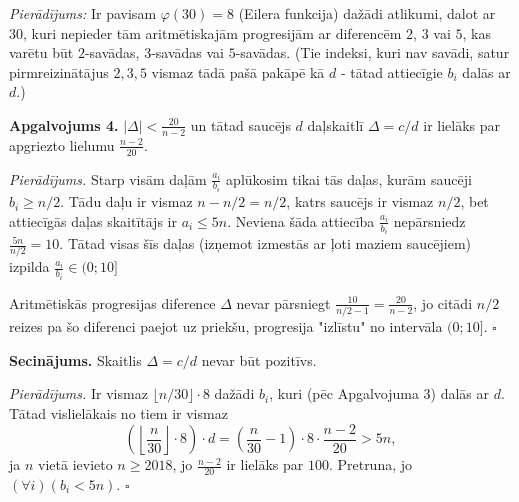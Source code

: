 \documentclass[11pt]{article}
\begin{document}
{\em Pierādījums:} Ir pavisam $\varphi(30)=8$ (Eilera funkcija) 
dažādi atlikumi, dalot ar $30$, kuri 
nepieder tām aritmētiskajām progresijām ar diferencēm $2$, $3$ vai $5$, kas
varētu būt $2$-savādas, $3$-savādas vai $5$-savādas. (Tie indeksi, kuri nav savādi, 
satur pirmreizinātājus $2,3,5$ vismaz tādā pašā pakāpē kā $d$ - tātad
attiecīgie $b_i$ dalās ar $d$.)

{\bf Apgalvojums 4.} $|\Delta| < \frac{20}{n-2}$ un tātad saucējs $d$ 
daļskaitlī $\Delta=c/d$ ir lielāks par apgriezto lielumu $\frac{n-2}{20}$. 

{\em Pierādījums.} Starp visām daļām $\frac{a_i}{b_i}$ aplūkosim 
tikai tās daļas, kurām saucēji $b_i \geq n/2$. Tādu daļu ir 
vismaz $n-n/2 = n/2$, katrs saucējs ir vismaz $n/2$, bet attiecīgās
daļas skaitītājs ir $a_i \leq 5n$. Neviena šāda attiecība
$\frac{a_i}{b_i}$ nepārsniedz $\frac{5n}{n/2}=10$. 
Tātad visas šīs daļas (izņemot izmestās ar ļoti maziem 
saucējiem) izpilda $\frac{a_i}{b_i} \in (0;10]$

Aritmētiskās progresijas diference $\Delta$ nevar pārsniegt $\frac{10}{n/2 - 1} = 
\frac{20}{n-2}$, jo citādi $n/2$ reizes pa šo diferenci paejot uz priekšu, 
progresija "izlīstu" no intervāla $(0;10]$. $\square$

{\bf Secinājums.} Skaitlis $\Delta = c/d$ nevar būt pozitīvs.

{\em Pierādījums.} Ir vismaz $\lfloor n/30 \rfloor \cdot 8$ dažādi 
$b_i$, kuri (pēc Apgalvojuma 3) dalās ar $d$. Tātad vislielākais no 
tiem ir vismaz
$$ \left( \left\lfloor \frac{n}{30} \right\rfloor \cdot 8 \right) \cdot d = 
\left( \frac{n}{30} - 1 \right) \cdot 8 \cdot \frac{n-2}{20} > 5n,$$
ja $n$ vietā ievieto $n \geq 2018$, jo $\frac{n-2}{20}$ ir lielāks par $100$. 
Pretruna, jo $(\forall i)(b_i < 5n)$. $\square$
\end{document}

